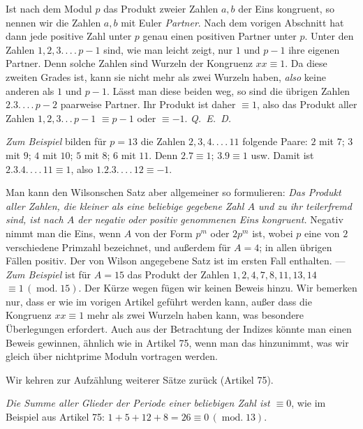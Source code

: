 Ist nach dem Modul $p$ das Produkt zweier Zahlen $a,b$ der Eins kongruent, so nennen wir die Zahlen $a,b$ mit Euler \emph{Partner}. Nach dem vorigen Abschnitt hat dann jede positive Zahl unter $p$ genau einen positiven Partner unter $p$. Unter den Zahlen $1,2,3\mathpunct{.\,.\,.\,.}\,p-1$ sind, wie man leicht zeigt, nur $1$ und $p-1$ ihre eigenen Partner. Denn solche Zahlen sind Wurzeln der Kongruenz $xx\equiv1$. Da diese zweiten Grades ist, kann sie nicht mehr als zwei Wurzeln haben, \emph{also} keine anderen als $1$ und $p-1$. Lässt man diese beiden weg, so sind die übrigen Zahlen $2.3\mathpunct{.\,.\,.\,.}\,p-2$ paarweise Partner. Ihr Produkt ist daher $\equiv1$, also das Produkt aller Zahlen $1,2,3\mathpunct{.\,.\,.}\,p-1$ $\equiv p-1$ oder $\equiv-1$. \mbox{\emph{Q. E. D.}}

\emph{Zum Beispiel} bilden für $p=13$ die Zahlen $2,3,4\mathpunct{.\,.\,.\,.}\,11$ folgende Paare: $2$ mit $7$; $3$ mit $9$; $4$ mit $10$; $5$ mit $8$; $6$ mit $11$. Denn $2.7\equiv1$; $3.9\equiv1$ usw. Damit ist $2.3.4\mathpunct{.\,.\,.\,.}\,11\equiv1$, also $1.2.3\mathpunct{.\,.\,.\,.}\,12\equiv-1$.

Man kann den Wilsonschen Satz aber allgemeiner so formulieren: \emph{Das Produkt aller Zahlen, die kleiner als eine beliebige gegebene Zahl $A$ und zu ihr teilerfremd sind, ist nach $A$ der negativ oder positiv genommenen Eins kongruent.} Negativ nimmt man die Eins, wenn $A$ von der Form $p^m$ oder $2p^m$ ist, wobei $p$ eine
von $2$ verschiedene Primzahl bezeichnet, und außerdem für $A=4$; in allen übrigen Fällen positiv. Der von Wilson angegebene Satz ist im ersten Fall enthalten. --- \emph{Zum Beispiel} ist für $A=15$ das Produkt der Zahlen $1,2,4,7,8,11,13,14$ $\equiv1\,(\operatorname{mod.}15)$. Der Kürze wegen fügen wir keinen Beweis hinzu. Wir bemerken nur, dass er wie im vorigen Artikel geführt werden kann, außer dass die Kongruenz $xx\equiv1$ mehr als zwei Wurzeln haben kann, was besondere Überlegungen erfordert. Auch aus der Betrachtung der Indizes könnte man einen Beweis gewinnen, ähnlich wie in Artikel 75, wenn man das hinzunimmt, was wir gleich über nichtprime Moduln vortragen werden.

Wir kehren zur Aufzählung weiterer Sätze zurück (Artikel 75).

\emph{Die Summe aller Glieder der Periode einer beliebigen Zahl ist $\equiv0$}, wie im Beispiel aus Artikel 75: $1+5+12+8=26\equiv0\,(\operatorname{mod.}13)$.

